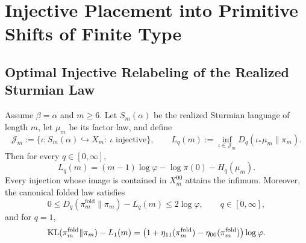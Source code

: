 \section{Injective Placement into Primitive Shifts of Finite Type}
\label{sec:injective-placement}

\subsection{Optimal Injective Relabeling of the Realized Sturmian Law}

\begin{theorem}
\label{thm:optimal-injective-relabeling}
Assume \(\beta=\alpha\) and \(m\ge 6\). Let \(S_m(\alpha)\) be the realized
Sturmian language of length \(m\), let \(\mu_m\) be its factor law, and define
\[
\mathcal J_m
:=
\{\iota:S_m(\alpha)\hookrightarrow X_m:\ \iota\text{ injective}\},
\qquad
L_q(m)
:=
\inf_{\iota\in\mathcal J_m}D_q(\iota_*\mu_m\|\pi_m).
\]
Then for every \(q\in[0,\infty]\),
\[
L_q(m)
=
(m-1)\log\varphi-\log\pi(0)-H_q(\mu_m).
\]
Every injection whose image is contained in \(X_m^{00}\) attains the infimum.
Moreover, the canonical folded law satisfies
\[
0\le D_q(\pi_m^{\mathrm{fold}}\|\pi_m)-L_q(m)\le 2\log\varphi,
\qquad q\in[0,\infty],
\]
and for \(q=1\),
\[
\operatorname{KL}(\pi_m^{\mathrm{fold}}\|\pi_m)-L_1(m)
=
\bigl(1+\eta_{11}(\pi_m^{\mathrm{fold}})
-\eta_{00}(\pi_m^{\mathrm{fold}})\bigr)\log\varphi.
\]
\end{theorem}

